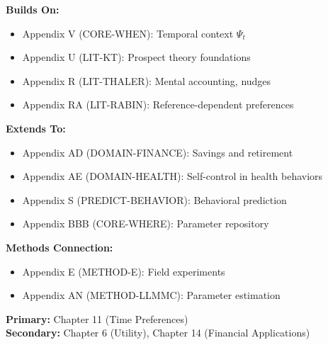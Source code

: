 \begin{tcolorbox}[colback=blue!5!white,colframe=blue!75!black,title=Cross-Reference Map]
\textbf{Builds On:}
\begin{itemize}
    \item Appendix V (CORE-WHEN): Temporal context $\Psi_t$
    \item Appendix U (LIT-KT): Prospect theory foundations
    \item Appendix R (LIT-THALER): Mental accounting, nudges
    \item Appendix RA (LIT-RABIN): Reference-dependent preferences
\end{itemize}

\textbf{Extends To:}
\begin{itemize}
    \item Appendix AD (DOMAIN-FINANCE): Savings and retirement
    \item Appendix AE (DOMAIN-HEALTH): Self-control in health behaviors
    \item Appendix S (PREDICT-BEHAVIOR): Behavioral prediction
    \item Appendix BBB (CORE-WHERE): Parameter repository
\end{itemize}

\textbf{Methods Connection:}
\begin{itemize}
    \item Appendix E (METHOD-E): Field experiments
    \item Appendix AN (METHOD-LLMMC): Parameter estimation
\end{itemize}
\end{tcolorbox}

\begin{tcolorbox}[colback=green!5!white,colframe=green!75!black,title=Chapter Linkage]
\textbf{Primary:} Chapter 11 (Time Preferences) \\
\textbf{Secondary:} Chapter 6 (Utility), Chapter 14 (Financial Applications)
\end{tcolorbox}

\begin{abstract}
This appendix integrates David Laibson's foundational research on hyperbolic discounting and present bias into the Evidence-Based Framework. Laibson's $\beta$-$\delta$ model revolutionized how economists model intertemporal choice by capturing the systematic tendency to overweight immediate rewards. His work on default effects in 401(k) plans demonstrated how choice architecture can leverage present bias to improve welfare. This appendix provides the core parameters for CORE-WHEN and establishes the theoretical foundation for commitment devices and paternalistic interventions.
\end{abstract}

